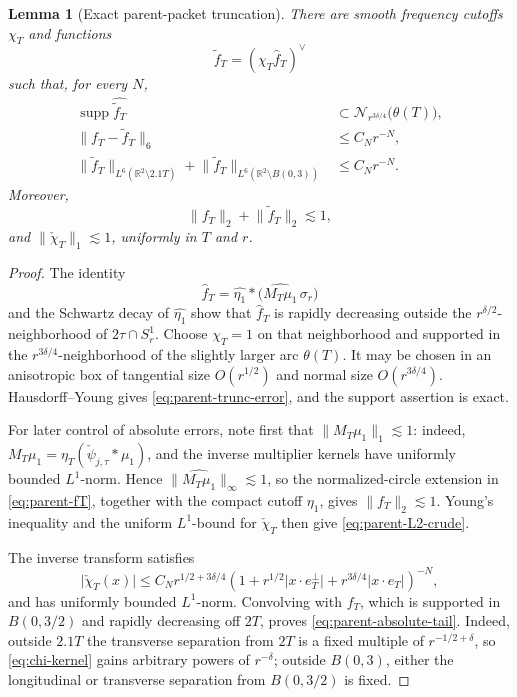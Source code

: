 \documentclass[11pt,letterpaper]{amsart}
\newtheorem{lemma}[lemma]{Lemma}
\newcommand{\R}{\mathbb{R}}
\newcommand{\supp}{\operatorname{supp}}
\newcommand{\cN}{\mathcal{N}}
\newcommand{\wh}{\widehat}
\newcommand{\abs}[1]{\lvert#1\rvert}
\newcommand{\norm}[1]{\lVert#1\rVert}
\begin{document}
\begin{lemma}[Exact parent-packet truncation]
\label{lem:parent-truncation}
There are smooth frequency cutoffs \(\chi_T\) and functions
\[
 \widetilde f_T=(\chi_T\wh f_T)^\vee
\]
such that, for every \(N\),
\begin{align}
 \supp\wh{\widetilde f_T}
 &\subset\cN_{r^{3\delta/4}}\bigl(\theta(T)\bigr),
 \label{eq:parent-exact-support}\\
 \norm{f_T-\widetilde f_T}_6
 &\le C_Nr^{-N},
 \label{eq:parent-trunc-error}\\
 \norm{\widetilde f_T}_{L^6(\R^2\setminus2.1T)}
 +\norm{\widetilde f_T}_{L^6(\R^2\setminus B(0,3))}
 &\le C_Nr^{-N}.
 \label{eq:parent-absolute-tail}
\end{align}
Moreover,
\begin{equation}\label{eq:parent-L2-crude}
 \norm{f_T}_2+\norm{\widetilde f_T}_2\lesssim1,
\end{equation}
and \(\norm{\check\chi_T}_1\lesssim1\), uniformly in \(T\) and \(r\).
\end{lemma}

\begin{proof}
The identity
\[
 \wh f_T=\wh{\eta_1}*
 \bigl(\wh{M_T\mu_1}\,\sigma_r\bigr)
\]
and the Schwartz decay of \(\wh{\eta_1}\) show that \(\wh f_T\) is rapidly
decreasing outside the \(r^{\delta/2}\)-neighborhood of
\(2\tau\cap S_r^1\).  Choose \(\chi_T=1\) on that neighborhood and supported
in the \(r^{3\delta/4}\)-neighborhood of the slightly larger arc
\(\theta(T)\).  It may be chosen in an anisotropic box of tangential size
\(O(r^{1/2})\) and normal size \(O(r^{3\delta/4})\).  Hausdorff--Young gives
\eqref{eq:parent-trunc-error}, and the support assertion is exact.

For later control of absolute errors, note first that
\(\norm{M_T\mu_1}_1\lesssim1\): indeed,
\(M_T\mu_1=\eta_T(\check\psi_{j,\tau}*\mu_1)\), and the inverse
multiplier kernels have uniformly bounded \(L^1\)-norm.  Hence
\(\norm{\widehat{M_T\mu_1}}_\infty\lesssim1\), so the normalized-circle
extension in \eqref{eq:parent-fT}, together with the compact cutoff
\(\eta_1\), gives \(\norm{f_T}_2\lesssim1\).  Young's inequality and the
uniform \(L^1\)-bound for \(\check\chi_T\) then give
\eqref{eq:parent-L2-crude}.

The inverse transform satisfies
\begin{equation}\label{eq:chi-kernel}
 \abs{\check\chi_T(x)}
 \le C_N r^{1/2+3\delta/4}
 \left(1+r^{1/2}\abs{x\cdot e_T^\perp}
          +r^{3\delta/4}\abs{x\cdot e_T}\right)^{-N},
\end{equation}
and has uniformly bounded \(L^1\)-norm.  Convolving with \(f_T\), which is
supported in \(B(0,3/2)\) and rapidly decreasing off \(2T\), proves
\eqref{eq:parent-absolute-tail}.  Indeed, outside \(2.1T\) the transverse
separation from \(2T\) is a fixed multiple of
\(r^{-1/2+\delta}\), so \eqref{eq:chi-kernel} gains arbitrary powers of
\(r^{-\delta}\); outside \(B(0,3)\), either the longitudinal or transverse
separation from \(B(0,3/2)\) is fixed.
\end{proof}
\end{document}
